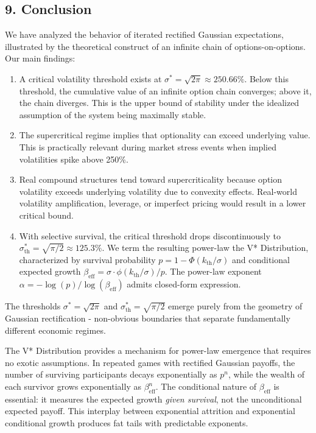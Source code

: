 \documentclass[
  11pt,
  openany]{article}
\renewcommand{\labelenumi}{\arabic{enumi}.}
\begin{document}
\subsection{9. Conclusion}\label{conclusion}

We have analyzed the behavior of iterated rectified Gaussian
expectations, illustrated by the theoretical construct of an infinite
chain of options-on-options. Our main findings:

\begin{enumerate}
\def\labelenumi{\arabic{enumi}.}
\item
  A critical volatility threshold exists at
  \(\sigma^* = \sqrt{2\pi} \approx 250.66\%\). Below this threshold, the
  cumulative value of an infinite option chain converges; above it, the
  chain diverges. This is the upper bound of stability under the
  idealized assumption of the system being maximally stable.
\item
  The supercritical regime implies that optionality can exceed
  underlying value. This is practically relevant during market stress
  events when implied volatilities spike above 250\%.
\item
  Real compound structures tend toward supercriticality because option
  volatility exceeds underlying volatility due to convexity effects.
  Real-world volatility amplification, leverage, or imperfect pricing
  would result in a lower critical bound.
\item
  With selective survival, the critical threshold drops discontinuously
  to \(\sigma_{\text{th}}^{*} = \sqrt{\pi/2} \approx 125.3\%\). We term
  the resulting power-law the V* Distribution, characterized by survival
  probability \(p = 1 - \Phi(k_{\text{th}}/\sigma)\) and conditional
  expected growth
  \(\beta_{\text{eff}} = \sigma \cdot \phi(k_{\text{th}}/\sigma)/p\).
  The power-law exponent \(\alpha = -\log(p)/\log(\beta_{\text{eff}})\)
  admits closed-form expression.
\end{enumerate}

The thresholds \(\sigma^* = \sqrt{2\pi}\) and
\(\sigma_{\text{th}}^{*} = \sqrt{\pi/2}\) emerge purely from the
geometry of Gaussian rectification - non-obvious boundaries that
separate fundamentally different economic regimes.

The V* Distribution provides a mechanism for power-law emergence that
requires no exotic assumptions. In repeated games with rectified
Gaussian payoffs, the number of surviving participants decays
exponentially as \(p^n\), while the wealth of each survivor grows
exponentially as \(\beta_{\text{eff}}^n\). The conditional nature of
\(\beta_{\text{eff}}\) is essential: it measures the expected growth
\emph{given survival}, not the unconditional expected payoff. This
interplay between exponential attrition and exponential conditional
growth produces fat tails with predictable exponents.
\end{document}

